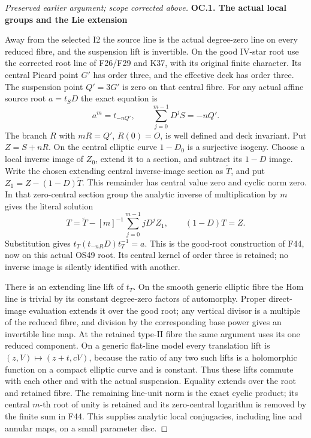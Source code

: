 \begin{proof}[Preserved earlier argument; scope corrected above]
\par

\medskip\noindent\textbf{OC.1. The actual local groups and the Lie extension}

\par\nobreak

Away from the selected I2 the source line is the actual degree-zero
line on every reduced fibre, and the suspension lift is invertible.
On the good IV-star root use the corrected root line of F26/F29 and
K37, with its original finite character. Its central Picard point
\(G'\) has order three, and the effective deck has order three.
The suspension point \(Q'=3G'\) is zero on that central fibre.
For any actual affine source root \(a=t_S D\) the exact equation is
\[
       a^m=t_{-nQ'},\qquad
       \sum_{j=0}^{m-1}D^jS=-nQ'.                         \tag{OC.1}
\]
The branch \(R\) with \(mR=Q'\), \(R(0)=O\), is
well defined and deck invariant. Put \(Z=S+nR\). On the central
elliptic curve \(1-D_0\) is a surjective isogeny. Choose a local
inverse image of \(Z_0\), extend it to a section, and subtract
its \(1-D\) image. Write the chosen extending central inverse-image section as
\(\widetilde T\), and put
\(Z_1=Z-(1-D)\widetilde T\). This remainder has central value zero
and cyclic norm zero. In that zero-central section group the analytic
inverse of multiplication by \(m\) gives the literal solution
\[
 T=\widetilde T-[m]^{-1}\sum_{j=0}^{m-1}jD^jZ_1,
                 \qquad (1-D)T=Z.                        \tag{OC.2}
\] Substitution
gives \(t_T(t_{-nR}D)t_T^{-1}=a\). This is the good-root
construction of F44, now on this actual OS49 root. Its central kernel
of order three is retained; no inverse image is silently identified
with another.

There is an extending line lift of \(t_T\). On the smooth
generic elliptic fibre the Hom line is trivial by its constant
degree-zero factors of automorphy. Proper direct-image evaluation
extends it over the good root; any vertical divisor is a multiple of
the reduced fibre, and division by the corresponding base power gives
an invertible line map. At the retained type-II fibre the same
argument uses its one reduced component. On a generic flat-line
model every translation lift is \((z,V)\mapsto(z+t,cV)\),
because the ratio of any two such lifts is a holomorphic function on
a compact elliptic curve and is constant. Thus these lifts commute
with each other and with the actual suspension. Equality extends
over the root and retained fibre. The remaining line-unit norm is
the exact cyclic product; its central \(m\)-th root of unity is
retained and its zero-central logarithm is removed by the finite sum
in F44. This supplies analytic local conjugacies, including line and
annular maps, on a small parameter disc.


\end{proof}
